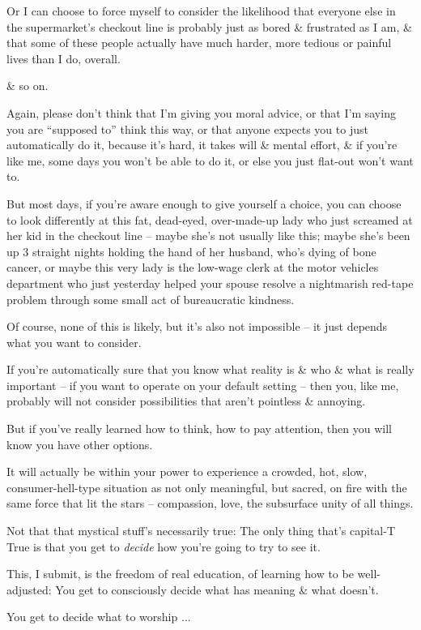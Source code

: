 \documentclass{article}
\begin{document}
Or I can choose to force myself to consider the likelihood that everyone else in the supermarket's checkout line is probably just as bored \& frustrated as I am, \& that some of these people actually have much harder, more tedious or painful lives than I do, overall.

\& so on.

Again, please don't think that I'm giving you moral advice, or that I'm saying you are ``supposed to'' think this way, or that anyone expects you to just automatically do it, because it's hard, it takes will \& mental effort, \& if you're like me, some days you won't be able to do it, or else you just flat-out won't want to.

But most days, if you're aware enough to give yourself a choice, you can choose to look differently at this fat, dead-eyed, over-made-up lady who just screamed at her kid in the checkout line -- maybe she's not usually like this; maybe she's been up 3 straight nights holding the hand of her husband, who's dying of bone cancer, or maybe this very lady is the low-wage clerk at the motor vehicles department who just yesterday helped your spouse resolve a nightmarish red-tape problem through some small act of bureaucratic kindness.

Of course, none of this is likely, but it's also not impossible -- it just depends what you want to consider.

If you're automatically sure that you know what reality is \& who \& what is really important -- if you want to operate on your default setting -- then you, like me, probably will not consider possibilities that aren't pointless \& annoying.

But if you've really learned how to think, how to pay attention, then you will know you have other options.

It will actually be within your power to experience a crowded, hot, slow, consumer-hell-type situation as not only meaningful, but sacred, on fire with the same force that lit the stars -- compassion, love, the subsurface unity of all things.

Not that that mystical stuff's necessarily true: The only thing that's capital-T True is that you get to {\it decide} how you're going to try to see it.

This, I submit, is the freedom of real education, of learning how to be well-adjusted: You get to consciously decide what has meaning \& what doesn't.

You get to decide what to worship $\ldots$
\end{document}
